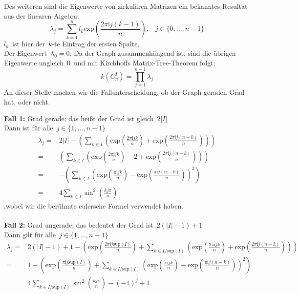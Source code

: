 Des weiteren sind die Eigenwerte von zirkulären Matrizen ein bekanntes Resultat aus der linearen Algebra:
\begin{equation}
 \lambda_j = \sum_{k=1}^{n}l_k\mathrm{exp}{\left(\frac{2\pi \mathrm{i}j(k-1)}{n}\right)}, \,\,\,\,\, {j\in\{0,\ldots,n-1\}}
 \label{cGE}
\end{equation}
$l_k\,$ ist hier der $\,k$-te Eintrag der ersten Spalte.\\ 
Der Eigenwert $\,\lambda_0 = 0$.\; \;  Da der Graph zusammenhängend ist, sind die übrigen Eigenwerte ungleich $\,0\,$ und mit Kirchhoffs Matrix-Tree-Theorem folgt:
\begin{equation*}
 \mathit{k}(C_n^I)=\prod_{j=1}^{n-1} \lambda_j
\end{equation*}
An dieser Stelle machen wir die Fallunterscheidung, ob der Graph geraden Grad hat, oder nicht.\\
\par
\begingroup
\leftskip=20pt
\rightskip=20pt
\noindent
\textbf{Fall 1:} Grad gerade; das heißt der Grad ist gleich $\,2|I|$\\
Dann ist für alle $\,j \in \{1,\ldots,n-1\}$
\begin{equation*}
\begin{aligned}
 \lambda_j = {} & {2|I| - \left( \sum_{k\in I}\left(\mathrm{exp}{\left(\frac{2\pi \mathrm{i}jk}{n}\right)} + \mathrm{exp}{\left(\frac{2\pi \mathrm{i}j(n-k)}{n}\right)}\right)\right)}\\
 = {} & {\left( \sum_{k\in I}\left(\mathrm{exp}{\left(\frac{2\pi \mathrm{i}jk}{n}\right)} - 2 + \mathrm{exp}{\left(\frac{2\pi \mathrm{i}j(n-k)}{n}\right)}\right)\right)}\\
 = {} &-\left( \sum_{k\in I}\left(\mathrm{exp}{\left(\frac{\pi \mathrm{i}jk}{n}\right)} - \mathrm{exp}{\left(\frac{\pi \mathrm{i}j(n-k)}{n}\right)}\right)^2\right)\\
 ={} & 4\sum_{k\in I} \sin^2 \left( \frac{kj\pi}{n}\right)
 \end{aligned}
\end{equation*}
,wobei wir die berühmte eulersche Formel verwendet haben.\\
\\ \textbf{Fall 2:} Grad ungerade; das bedeutet der Grad ist $\,2(|I|-1) + 1$\\
Dann gilt für alle $\,j \in \{1,\ldots,n-1\}$
\small
\begin{equation*}
\begin{aligned}
 \lambda_j = {} & { 2(|I|-1)+1 - \left(\mathrm{exp}{\left(\frac{2\pi \mathrm{i}j \mathrm{sup}(I)}{n}\right)}+ \sum_{k\in I/\mathrm{sup}(I)}\left(\mathrm{exp}{\left(\frac{2\pi \mathrm{i}jk}{n}\right)}+ \mathrm{exp}{\left(\frac{2\pi \mathrm{i}j(n-k)}{n}\right)}\right)\right)}\\
  = {} &1-\left(\mathrm{exp}{\left(\frac{\pi \mathrm{i}j \mathrm{sup}(I)}{n}\right)} +\sum_{k\in I/\mathrm{sup}(I)}\left(\mathrm{exp}{\left(\frac{\pi \mathrm{i}jk}{n}\right)} - \mathrm{exp}{\left(\frac{\pi \mathrm{i}j(n-k)}{n}\right)}\right)^2\right)\\
  = {} & 4\sum_{k\in I/\mathrm{sup}(I)} \sin^2 \left( \frac{kj\pi}{n}\right)-(-1)^j+1
 \end{aligned}
\end{equation*}
